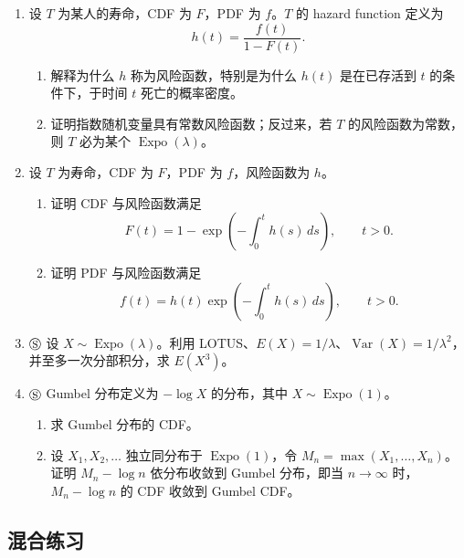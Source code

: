 \documentclass[UTF8,12pt,a4paper,fontset=fandol]{ctexart}
\begin{document}
\begin{enumerate}
  \item 设 $T$ 为某人的寿命，CDF 为 $F$，PDF 为 $f$。$T$ 的 hazard function 定义为
  \[
    h(t)=\frac{f(t)}{1-F(t)}.
  \]
  \begin{enumerate}
    \item 解释为什么 $h$ 称为风险函数，特别是为什么 $h(t)$ 是在已存活到 $t$ 的条件下，于时间 $t$ 死亡的概率密度。
    \item 证明指数随机变量具有常数风险函数；反过来，若 $T$ 的风险函数为常数，则 $T$ 必为某个 $\operatorname{Expo}(\lambda)$。
  \end{enumerate}

  \item 设 $T$ 为寿命，CDF 为 $F$，PDF 为 $f$，风险函数为 $h$。
  \begin{enumerate}
    \item 证明 CDF 与风险函数满足
    \[
      F(t)=1-\exp\left(-\int_0^t h(s)\,ds\right),\qquad t>0.
    \]
    \item 证明 PDF 与风险函数满足
    \[
      f(t)=h(t)\exp\left(-\int_0^t h(s)\,ds\right),\qquad t>0.
    \]
  \end{enumerate}

  \item $\circledS$ 设 $X\sim\operatorname{Expo}(\lambda)$。利用 LOTUS、$E(X)=1/\lambda$、$\operatorname{Var}(X)=1/\lambda^2$，并至多一次分部积分，求 $E(X^3)$。

  \item $\circledS$ Gumbel 分布定义为 $-\log X$ 的分布，其中 $X\sim\operatorname{Expo}(1)$。
  \begin{enumerate}
    \item 求 Gumbel 分布的 CDF。
    \item 设 $X_1,X_2,\ldots$ 独立同分布于 $\operatorname{Expo}(1)$，令 $M_n=\max(X_1,\ldots,X_n)$。证明 $M_n-\log n$ 依分布收敛到 Gumbel 分布，即当 $n\to\infty$ 时，$M_n-\log n$ 的 CDF 收敛到 Gumbel CDF。
  \end{enumerate}
\end{enumerate}

\subsection*{混合练习}
\end{document}

